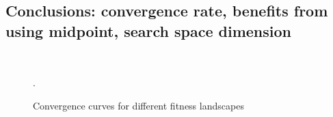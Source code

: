 \subsection{Conclusions: convergence rate, benefits from using midpoint, search space dimension}

\begin{figure}[H]
 \\
  \caption{Convergence curves for different fitness landscapes}.
\label{some example}
\end{figure}
